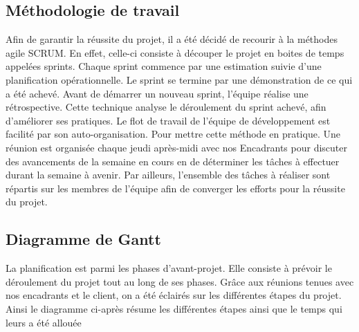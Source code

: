	\subsection {Méthodologie de travail }
	Afin de garantir la réussite du projet, il a été décidé de recourir à la méthodes agile SCRUM. En effet, celle-ci consiste à découper le projet en boites de temps appelées sprints. Chaque sprint commence par une estimation suivie d'une planification opérationnelle. Le sprint se termine par une démonstration de ce qui a été achevé. Avant de démarrer un nouveau sprint, l'équipe réalise une rétrospective. Cette technique analyse le déroulement du sprint achevé, afin d'améliorer ses pratiques. Le flot de travail de l'équipe de développement est facilité par son auto-organisation. 
	Pour mettre cette méthode en pratique. Une réunion est organisée chaque jeudi après-midi avec nos Encadrants pour discuter des avancements de la semaine en cours en de déterminer les tâches à effectuer durant la semaine à avenir. Par ailleurs, l’ensemble des tâches à réaliser sont répartis sur les membres de l’équipe afin de converger les efforts pour la réussite du projet. 
	
	
	\subsection{Diagramme de Gantt}
	La planification est parmi les phases d’avant-projet. Elle consiste à prévoir le déroulement du projet tout au long de ses phases. Grâce aux réunions tenues avec nos encadrants et le client, on a été éclairés sur les différentes étapes du projet.
	Ainsi le diagramme ci-après résume les différentes étapes ainsi que le temps qui leurs a été allouée
	
